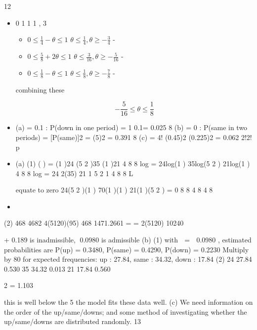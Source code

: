 \documentclass[a4paper,12pt]{article}
\begin{document}
\begin{enumerate}
12 
\begin{itemize}
\item 0 1 1 1 , 3

\begin{itemize}
\item ${\displaystyle 0 \leq \frac{1}{4} -\theta \leq 1 }$  ${\displaystyle  \theta \leq \frac{1}{4}, \theta \geq -\frac{3}{4} }$ -

\item ${\displaystyle 0 \leq \frac{5}{8} +2\theta \leq 1 }$  ${\displaystyle  \theta \leq \frac{3}{16}, \theta \geq -\frac{5}{16} }$ -

\item ${\displaystyle 0 \leq \frac{1}{8} -\theta \leq 1 }$  ${\displaystyle  \theta \leq \frac{1}{8}, \theta \geq -\frac{7}{8} }$ -

\end{itemize}
combining these

\[ - \frac{5}{16} \leq \theta \leq \frac{1}{8}\]
\item
(a) 	 = 0.1 : P(down in one period) = 1 0.1= 0.025
8 
(b) 	 = 0 : P(same in two periods) = [P(same)]2 = (5)2 = 0.391
8
(c) %
= 4! (0.45)2 (0.225)2 = 0.062
2!2!
p
\item
(a) (1) ( ) = (1 )24 (5 2 )35 (1 )21
4 8 8
log = 24log(1 ) 35log(5 2 ) 21log(1 )
4 8 8
log = 24 2(35) 21 1 5 2 1
4 8 8
 L

equate to zero %
24(5 2 )(1 ) 70(1 )(1 ) 21(1 )(5 2 ) = 0
8 8 4 8 4 8
    \item 
\end{itemize}
(2)
468 4682 4(5120)(95) 468 1471.2661 = =
2(5120) 10240


+ 0.189 is inadmissible, 0.0980 is admissible
(b) (1) with  =  0.0980 , estimated probabilities are
P(up) = 0.3480, P(same) = 0.4290, P(down) = 0.2230
Multiply by 80 for expected frequencies:
up : 27.84, same : 34.32, down : 17.84
(2)
24 27.84 0.530
35 34.32 0.013
21 17.84 0.560

2 = 1.103

this is well below the 5%
the model fits these data well.
(c) We need information on the order of the up/same/downs;
and some method of investigating whether the up/same/downs are distributed
randomly.
13 
\begin{itemize}


\end{itemize}
\end{enumerate}
\end{document}
